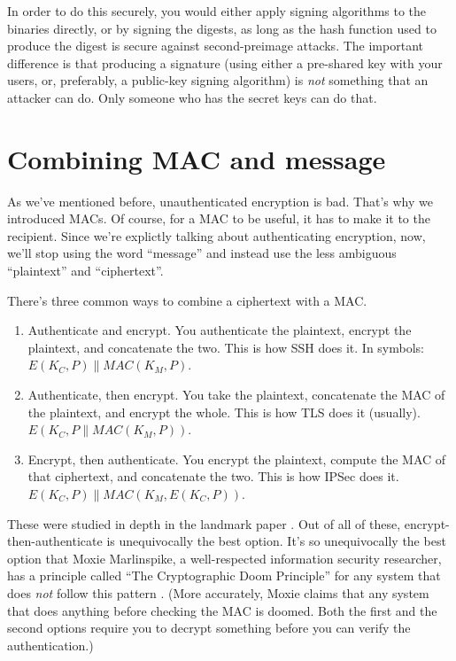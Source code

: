 \documentclass[11pt,ebook,table,dvipsnames]{memoir}
\begin{document}
In order to do this securely, you would either apply signing
algorithms to the binaries directly, or by signing the digests, as
long as the hash function used to produce the digest is secure against
second-preimage attacks. The important difference is that producing a
signature (using either a pre-shared key with your users, or,
preferably, a public-key signing algorithm) is \emph{not} something that an
attacker can do. Only someone who has the secret keys can do that.
\section{Combining MAC and message}
\label{sec-2-7-2}

As we've mentioned before, unauthenticated encryption is bad. That's
why we introduced MACs. Of course, for a MAC to be useful, it has to
make it to the recipient. Since we're explictly talking about
authenticating encryption, now, we'll stop using the word \enquote{message}
and instead use the less ambiguous \enquote{plaintext} and \enquote{ciphertext}.

There's three common ways to combine a ciphertext with a MAC.

\begin{enumerate}
\item Authenticate and encrypt. You authenticate the plaintext, encrypt
the plaintext, and concatenate the two. This is how SSH does it. In
symbols: $E(K_{C}, P) \| MAC(K_{M}, P)$.
\item Authenticate, then encrypt. You take the plaintext, concatenate the
MAC of the plaintext, and encrypt the whole. This is how TLS does
it (usually). $E(K_C, P \| MAC(K_M, P))$.
\item Encrypt, then authenticate. You encrypt the plaintext, compute the
MAC of that ciphertext, and concatenate the two. This is how IPSec
does it. $E(K_C, P) \| MAC(K_M, E(K_C, P))$.
\end{enumerate}

These were studied in depth in the landmark paper
\cite{krawczyk:order}. Out of all of these, encrypt-then-authenticate
is unequivocally the best option. It's so unequivocally the best
option that Moxie Marlinspike, a well-respected information security
researcher, has a principle called \enquote{The Cryptographic Doom Principle}
for any system that does \emph{not} follow this pattern \cite{moxie:doom}.
(More accurately, Moxie claims that any system that does anything
before checking the MAC is doomed. Both the first and the second
options require you to decrypt something before you can verify the
authentication.)
\end{document}
